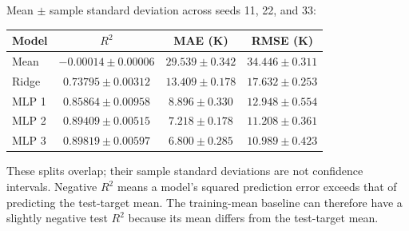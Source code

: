 \documentclass[12pt]{article}
\begin{document}
\begin{enumerate}
\begin{enumerate}[label=\textbf{\Alph*.}, leftmargin=*]
\begin{center}
{\begin{tabular}{l r r r r}
           \bottomrule
       \end{tabular}}
       \end{center}
       Mean $\pm$ sample standard deviation across seeds 11, 22, and 33:
       \begin{center}
       {\small
       \begin{tabular}{l c c c}
           \toprule
           Model & $R^2$ & MAE (K) & RMSE (K) \\
           \midrule
           Mean & $-0.00014\pm0.00006$ & $29.539\pm0.342$ & $34.446\pm0.311$ \\
           Ridge & $0.73795\pm0.00312$ & $13.409\pm0.178$ & $17.632\pm0.253$ \\
           MLP 1 & $0.85864\pm0.00958$ & $8.896\pm0.330$ & $12.948\pm0.554$ \\
           MLP 2 & $0.89409\pm0.00515$ & $7.218\pm0.178$ & $11.208\pm0.361$ \\
           MLP 3 & $0.89819\pm0.00597$ & $6.800\pm0.285$ & $10.989\pm0.423$ \\
           \bottomrule
       \end{tabular}}
       \end{center}
       These splits overlap; their sample standard deviations are not
       confidence intervals. Negative $R^2$ means a model's squared
       prediction error exceeds that of predicting the test-target mean.
       The training-mean baseline can therefore have a slightly negative
       test $R^2$ because its mean differs from the test-target mean.


\end{enumerate}
\end{enumerate}
\end{document}
